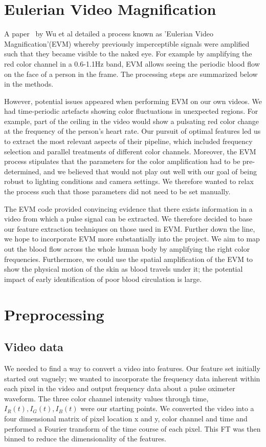 \documentclass[12pt]{article}
\begin{document}
\section{Eulerian Video Magnification}

A paper~\cite{Wu12Eulerian} by Wu et al detailed a process known as 'Eulerian Video Magnification'(EVM) whereby previously imperceptible signals were amplified such that they became visible to the naked eye. For example by amplifying the red color channel in a 0.6-1.1Hz band, EVM allows seeing the periodic blood flow on the face of a person in the frame. The processing steps are summarized below in the methods.

However, potential issues appeared when performing EVM on our own videos. We had time-periodic artefacts showing color fluctuations in unexpected regions. For example, part of the ceiling in the video would show a pulsating red color change at the frequency of the person's heart rate. Our pursuit of optimal features led us to extract the most relevant aspects of their pipeline, which included frequency selection and parallel treatments of different color channels. Moreover, the EVM process stipulates that the parameters for the color amplification had to be pre-determined, and we believed that would not play out well with our goal of being robust to lighting conditions and camera settings. We therefore wanted to relax the process such that those parameters did not need to be set manually.

The EVM code provided convincing evidence that there exists information in a video from which a pulse signal can be extracted. We therefore decided to base our feature extraction techniques on those used in EVM. Further down the line, we hope to incorporate EVM more substantially into the project. We aim to map out the blood flow across the whole human body by amplifying the right color frequencies. Furthermore, we could use the spatial amplification of the EVM to show the physical motion of the skin as blood travels under it; the potential impact of early identification of poor blood circulation is large.


\section{Preprocessing}
\subsection*{Video data}
  We needed to find a way to convert a video into features.
  Our feature set initially started out vaguely; we wanted to incorporate the frequency data inherent within each pixel in the video and output frequency data about a pulse oximeter waveform.
  The three color channel intensity values through time, \(I_R(t), I_G(t), I_B(t)\) were our starting points.
  We converted the video into a four dimensional matrix of pixel location x and y, color channel and time and performed a Fourier transform of the time course of each pixel.
  This FT was then binned to reduce the dimensionality of the features.
  
\end{document}
